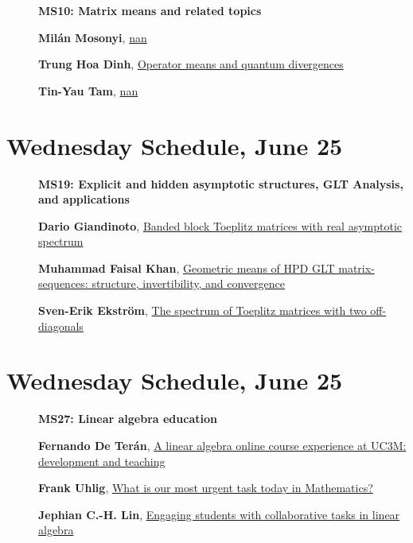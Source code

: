 \documentclass[ILAS2025-program.tex]{subfiles}
\begin{document}
        \begin{description}
    \item[] {\color{mstitle}\textbf{MS10: Matrix means and related topics}} 
    \item[] \hypertarget{up0253}{}\textbf{Milán Mosonyi}, \hyperlink{down0253}{nan}
        \item[] \hypertarget{up0254}{}\textbf{Trung Hoa Dinh}, \hyperlink{down0254}{Operator means and quantum divergences}
        \item[] \hypertarget{up0255}{}\textbf{Tin-Yau Tam}, \hyperlink{down0255}{nan}
        \end{description}
    \newpage

\section*{Wednesday Schedule, June 25 }
        
        \begin{description}
    \item[] {\color{mstitle}\textbf{MS19: Explicit and hidden asymptotic structures, GLT Analysis, and applications}} 
    \item[] \hypertarget{up0256}{}\textbf{Dario Giandinoto}, \hyperlink{down0256}{Banded block Toeplitz matrices with real asymptotic spectrum
}
        \item[] \hypertarget{up0257}{}\textbf{Muhammad Faisal Khan}, \hyperlink{down0257}{Geometric means of HPD GLT matrix-sequences: structure, invertibility, and convergence}
        \item[] \hypertarget{up0258}{}\textbf{Sven-Erik Ekström}, \hyperlink{down0258}{The spectrum of Toeplitz matrices with two off-diagonals}
        \end{description}
    \newpage

\section*{Wednesday Schedule, June 25 }
        
        \begin{description}
    \item[] {\color{mstitle}\textbf{MS27: Linear algebra education}} 
    \item[] \hypertarget{up0259}{}\textbf{Fernando De Terán}, \hyperlink{down0259}{A linear algebra online course experience at UC3M: development and teaching}
        \item[] \hypertarget{up0260}{}\textbf{Frank Uhlig}, \hyperlink{down0260}{What is our most urgent task today in Mathematics?
}
        \item[] \hypertarget{up0261}{}\textbf{Jephian C.-H. Lin}, \hyperlink{down0261}{Engaging students with collaborative tasks in linear algebra
}
        \end{description}
    \newpage
\end{document}
